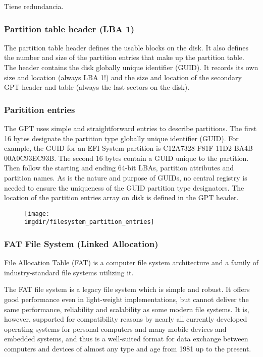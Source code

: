 \documentclass[a4paper, twoside]{article}
\newcommand{\imgdir}{../resources/images} %
\begin{document}
Tiene redundancia.

\subsubsection{Partition table header (LBA 1)}
The partition table header defines the usable blocks on the disk. It also defines the number and size of the partition entries that make up the partition table. The header contains the disk globally unique identifier (GUID). It records its own size and location (always LBA 1!) and the size and location of the secondary GPT header and table (always the last sectors on the disk).

\subsubsection{Paritition entries}
The GPT uses simple and straightforward entries to describe partitions. The first 16 bytes designate the partition type globally unique identifier (GUID). For example, the GUID for an EFI System partition is C12A7328-F81F-11D2-BA4B-00A0C93EC93B. The second 16 bytes contain a GUID unique to the partition. Then follow the starting and ending 64-bit LBAs, partition attributes and partition names. As is the nature and purpose of GUIDs, no central registry is needed to ensure the uniqueness of the GUID partition type designators. The location of the partition entries array on disk is defined in the GPT header.

\begin{figure}[h]
	\centering
	\texttt{[image: \\imgdir/filesystem\_partition\_entries]}
	\label{fig:filesystem_partition_entries}
\end{figure}

\subsubsection{FAT File System (Linked Allocation)}
File Allocation Table (FAT) is a computer file system architecture and a family of industry-standard file systems utilizing it.

The FAT file system is a legacy file system which is simple and robust. It offers good performance even in light-weight implementations, but cannot deliver the same performance, reliability and scalability as some modern file systems. It is, however, supported for compatibility reasons by nearly all currently developed operating systems for personal computers and many mobile devices and embedded systems, and thus is a well-suited format for data exchange between computers and devices of almost any type and age from 1981 up to the present.
\end{document}
